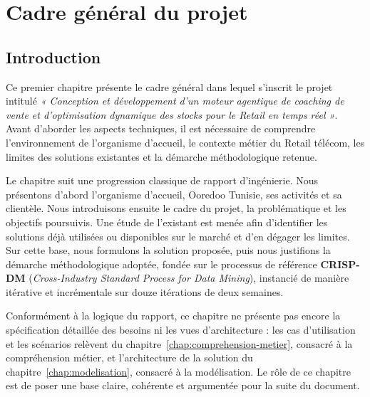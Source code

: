 
\chapter{Cadre général du projet}
\label{chap:cadre-general}


\section*{Introduction}

Ce premier chapitre présente le cadre général dans lequel s'inscrit le projet intitulé \textit{« Conception et développement d'un moteur agentique de coaching de vente et d'optimisation dynamique des stocks pour le Retail en temps réel »}. Avant d'aborder les aspects techniques, il est nécessaire de comprendre l'environnement de l'organisme d'accueil, le contexte métier du Retail télécom, les limites des solutions existantes et la démarche méthodologique retenue.

Le chapitre suit une progression classique de rapport d'ingénierie. Nous présentons d'abord l'organisme d'accueil, Ooredoo Tunisie, ses activités et sa clientèle. Nous introduisons ensuite le cadre du projet, la problématique et les objectifs poursuivis. Une étude de l'existant est menée afin d'identifier les solutions déjà utilisées ou disponibles sur le marché et d'en dégager les limites. Sur cette base, nous formulons la solution proposée, puis nous justifions la démarche méthodologique adoptée, fondée sur le processus de référence \textbf{CRISP-DM} (\textit{Cross-Industry Standard Process for Data Mining}), instancié de manière itérative et incrémentale sur douze itérations de deux semaines.

Conformément à la logique du rapport, ce chapitre ne présente pas encore la spécification détaillée des besoins ni les vues d'architecture : les cas d'utilisation et les scénarios relèvent du chapitre~\ref{chap:comprehension-metier}, consacré à la compréhension métier, et l'architecture de la solution du chapitre~\ref{chap:modelisation}, consacré à la modélisation. Le rôle de ce chapitre est de poser une base claire, cohérente et argumentée pour la suite du document.


